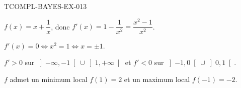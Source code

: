 \begin{corrige}{TCOMPL-BAYES-EX-013}

$f(x) = x + \dfrac{1}{x}$, donc $f'(x) = 1 - \dfrac{1}{x^2} = \dfrac{x^2-1}{x^2}$.


$f'(x) = 0 \iff x^2 = 1 \iff x = \pm 1$.

$f' > 0$ sur $\left]-\infty, -1\right[ \cup \left]1, +\infty\right[$ et $f' < 0$ sur $\left]-1, 0\right[ \cup \left]0, 1\right[$.

$f$ admet un minimum local $f(1) = 2$ et un maximum local $f(-1) = -2$.

\end{corrige}
